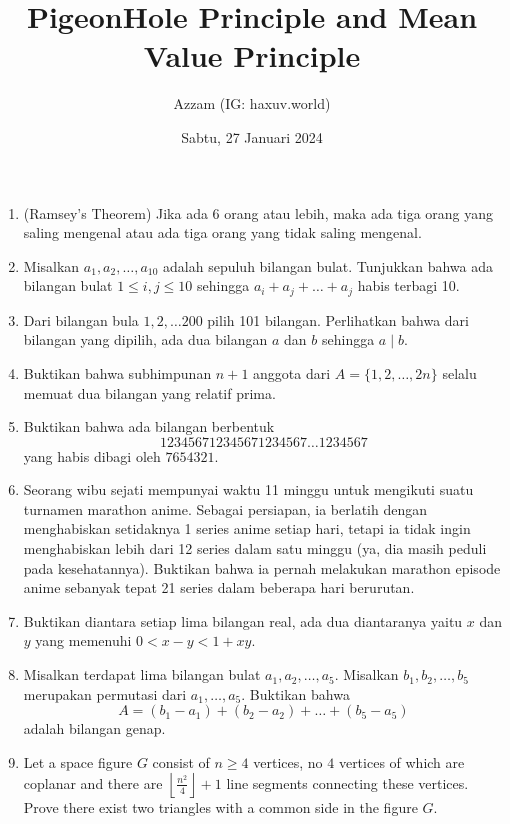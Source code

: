 \documentclass[12pt]{scrartcl}
\title{PigeonHole Principle and Mean Value Principle}
\author{Azzam (IG: haxuv.world)}
\date{Sabtu, 27 Januari 2024}
\begin{document}
\maketitle

\renewcommand*\contentsname{Daftar Isi}
\tableofcontents

\newpage
\begin{enumerate}
    \item (Ramsey's Theorem) Jika ada 6 orang atau lebih, maka ada tiga orang yang saling mengenal atau ada tiga orang yang tidak saling mengenal.

    \item Misalkan $a_1, a_2, \dots, a_{10}$ adalah sepuluh bilangan bulat. Tunjukkan bahwa ada bilangan bulat $1 \le i,j \le 10$ sehingga $a_i+a_j+\dots+a_j$ habis terbagi 10.

    \item Dari bilangan bula $1,2,\dots 200$ pilih 101 bilangan. Perlihatkan bahwa dari bilangan yang dipilih, ada dua bilangan $a$ dan $b$ sehingga $a \mid b$.

    \item Buktikan bahwa subhimpunan $n+1$ anggota dari $A=\{1,2,\dots, 2n\}$ selalu memuat dua bilangan yang relatif prima.

    \item Buktikan bahwa ada bilangan berbentuk $$123456712345671234567\dots1234567$$
    yang habis dibagi oleh $7654321$.

    \item Seorang wibu sejati mempunyai waktu 11 minggu untuk mengikuti suatu turnamen marathon anime. Sebagai persiapan, ia berlatih dengan menghabiskan setidaknya 1 series anime setiap hari, tetapi ia tidak ingin menghabiskan lebih dari 12 series dalam satu minggu (ya, dia masih peduli pada kesehatannya). Buktikan bahwa ia pernah melakukan marathon episode anime sebanyak tepat 21 series dalam beberapa hari berurutan.

    \item Buktikan diantara setiap lima bilangan real, ada dua diantaranya yaitu $x$ dan $y$ yang memenuhi $0 < x-y < 1+xy$.

    \item Misalkan terdapat lima bilangan bulat $a_1, a_2, \dots, a_5$. Misalkan $b_1,b_2,\dots,b_5$ merupakan permutasi dari $a_1,\dots,a_5$. Buktikan bahwa 
    $$A=(b_1-a_1)+(b_2-a_2)+\dots+(b_5-a_5)$$ adalah bilangan genap.

    \item Let a space figure $G$ consist of $n \ge 4$ vertices, no $4$ vertices of which are coplanar and there are $\left\lfloor \frac{n^2}{4} \right\rfloor + 1$ line segments connecting these vertices. Prove there exist two triangles with a common side in the figure $G$.
    

\end{enumerate}
\end{document}
